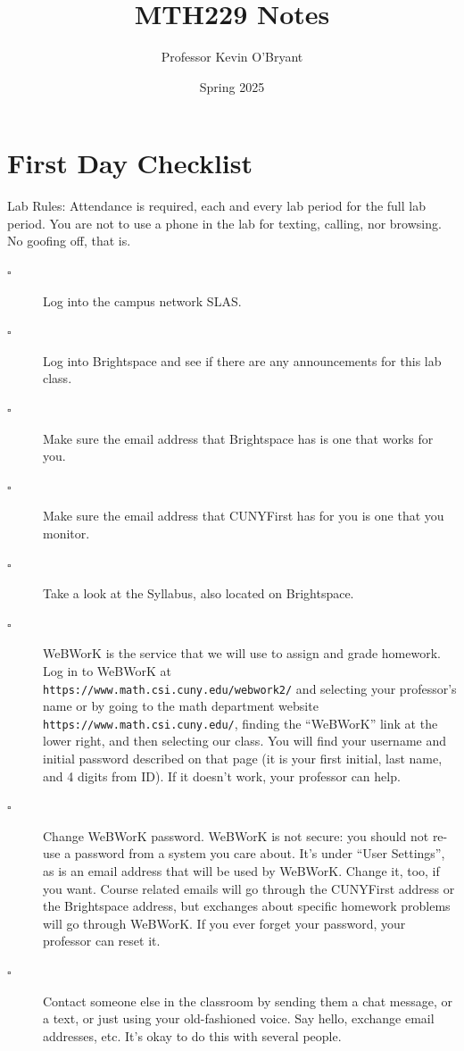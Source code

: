 \documentclass[12pt,answers]{book}
\title{MTH229 Notes}
\date{Spring 2025}
\author{Professor Kevin O'Bryant}
\begin{document}
  \maketitle
\chapter*{First Day Checklist}
Lab Rules: Attendance is required, each and every lab period for the full lab period. You are not to use a phone in the lab for texting, calling, nor browsing. No goofing off, that is.

\begin{description}
  \item[$\square$] Log into the campus network SLAS.
  \item[$\square$] Log into Brightspace and see if there are any announcements for this lab class.
  \item[$\square$] Make sure the email address that Brightspace has is one that works for you.
  \item[$\square$] Make sure the email address that CUNYFirst has for you is one that you monitor.
  \item[$\square$] Take a look at the Syllabus, also located on Brightspace.
  \item[$\square$] WeBWorK is the service that we will use to assign and grade homework. Log in to WeBWorK at \\ \verb|https://www.math.csi.cuny.edu/webwork2/| and selecting your professor's name
  or by going to the math department website \verb|https://www.math.csi.cuny.edu/|, finding the ``WeBWorK'' link at the lower right, and then selecting our class. You will find your username and initial password described on that page (it is your first initial, last name, and 4 digits from ID). If it doesn't work, your professor can help.
  \item[$\square$] Change WeBWorK password. WeBWorK is not secure: you should not re-use a password from a system you care about. It's under ``User Settings'', as is an email address that will be used by WeBWorK. Change it, too, if you want. Course related emails will go through the CUNYFirst address or the Brightspace address, but exchanges about specific homework problems will go through WeBWorK. If you ever forget your password, your professor can reset it.
  \item[$\square$] Contact someone else in the classroom by sending them a chat message, or a text, or just using your old-fashioned voice. Say hello, exchange email addresses, etc. It's okay to do this with several people.

\end{description}
\end{document}
